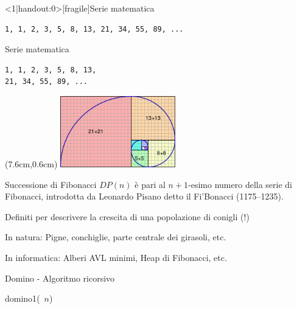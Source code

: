 \begin{frame}<1|handout:0>[fragile]{Serie matematica}


\begin{lstlisting}
1, 1, 2, 3, 5, 8, 13, 21, 34, 55, 89, ...
\end{lstlisting}


\end{frame}


\begin{frame}[fragile]{Serie matematica}


\begin{lstlisting}
1, 1, 2, 3, 5, 8, 13, 
21, 34, 55, 89, ...
\end{lstlisting}

\begin{textblock*}{5cm}(7.6cm,0.6cm) %
\includegraphics[width=5cm]{fibonacci.png}
\end{textblock*}

\begin{block}{Successione di Fibonacci}
$DP(n)$ è pari al $n+1$-esimo numero della serie di Fibonacci, introdotta da Leonardo Pisano detto il Fi'Bonacci (1175--1235).
\end{block}

\BIL
\item Definiti per descrivere la crescita di una popolazione di conigli (!)
\item In natura: Pigne, conchiglie, parte centrale dei girasoli, etc.
\item In informatica: Alberi AVL minimi, Heap di Fibonacci, etc.
\EIL

\end{frame}


\begin{frame}[fragile]{Domino - Algoritmo ricorsivo}



\begin{Procedure}
\caption[A]{\textsf{domino1}(\INTEGER\ $n$)}
\end{Procedure}


\end{frame}

